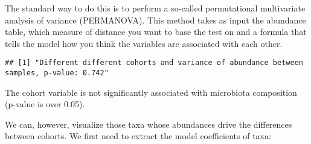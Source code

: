 \documentclass[
  oneside]{book}
\newenvironment{Shaded}{\begin{snugshade}}{\end{snugshade}}
\newcommand{\AttributeTok}[1]{\textcolor[rgb]{0.77,0.63,0.00}{#1}}
\newcommand{\CommentTok}[1]{\textcolor[rgb]{0.56,0.35,0.01}{\textit{#1}}}
\newcommand{\DecValTok}[1]{\textcolor[rgb]{0.00,0.00,0.81}{#1}}
\newcommand{\FunctionTok}[1]{\textcolor[rgb]{0.00,0.00,0.00}{#1}}
\newcommand{\NormalTok}[1]{#1}
\newcommand{\OtherTok}[1]{\textcolor[rgb]{0.56,0.35,0.01}{#1}}
\newcommand{\SpecialCharTok}[1]{\textcolor[rgb]{0.00,0.00,0.00}{#1}}
\newcommand{\StringTok}[1]{\textcolor[rgb]{0.31,0.60,0.02}{#1}}
\begin{document}
The standard way to do this is to perform a so-called permutational
multivariate analysis of variance (PERMANOVA). This method takes as
input the abundance table, which measure of distance you want to base
the test on and a formula that tells the model how you think the
variables are associated with each other.

\begin{Shaded}
\end{Shaded}

\begin{verbatim}
## [1] "Different different cohorts and variance of abundance between samples, p-value: 0.742"
\end{verbatim}

The cohort variable is not significantly associated with
microbiota composition (p-value is over 0.05).

We can, however, visualize those taxa whose abundances drive the
differences between cohorts. We first need to extract the model
coefficients of taxa:
\end{document}
